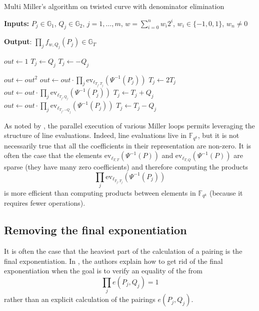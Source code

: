 \documentclass{article}
\newcommand{\gOne}{\mathbb{G}_1}
\newcommand{\gTwo}{\mathbb{G}_2}
\newcommand{\gT}{\mathbb{G}_T}
\newcommand{\ev}{\mathrm{ev}}
\newcommand{\fq}[1]{\mathbb{F}_{q^{#1}}}
\theoremstyle{remark}
\theoremstyle{plain}
\begin{document}
\begin{algorithm}
    \caption{\small Multi Miller's algorithm on twisted curve with denominator elimination}\label{alg:multiMillerAlgorithm}
    \textbf{Inputs:} $P_j \in \gOne$, $Q_j \in \gTwo$, $j=1, \dots, m$, $w = \sum_{i=0}^n w_i 2^i$, $w_i \in \{-1,0,1\}$, $w_n \neq 0$

    \textbf{Output}: $\prod_j f_{w,Q_j}(P_j) \in \gT$
    \begin{algorithmic}
        \State $out \gets 1$
            \State $T_j \gets Q_j$
        \Else
            \State $T_j \gets -Q_j$
        \EndIf

        \State $out \gets out^2$
        \State $out \gets out \cdot \prod_j \ev_{\ell_{T_j,T_j}}(\Psi^{-1}(P_j))$
        \State $T_j \gets 2T_j$
            \State $out \gets out \cdot \prod_j \ev_{\ell_{T_j,Q_j}}(\Psi^{-1}(P_j))$
            \State $T_j \gets T_j+ Q_j$
        \Else
            \State $out \gets out \cdot \prod_j \ev_{\ell_{T_j,-Q_j}}(\Psi^{-1}(P_j))$
            \State $T_j \gets T_j - Q_j$
        \EndIf
        \EndFor
    \end{algorithmic}
\end{algorithm}

As noted by \cite{S-pairing-impl-revisited}, the parallel execution of various Miller loops permits leveraging the structure of line evaluations.
Indeed, line evaluations live in $\fq{k}$, but it is not necessarily true that all the coefficients in their representation are non-zero.
It is often the case that the elements $\ev_{\ell_{T,T}}(\Psi^{-1}(P))$ and $\ev_{\ell_{T,Q}}(\Psi^{-1}(P))$ are sparse (they have many zero coefficients) and therefore computing the products
\[
    \prod_j \ev_{\ell_{T_j,T_j}}(\Psi^{-1}(P_j))
\]
is more efficient than computing products between elements in $\fq{k}$ (because it requires fewer operations).

\subsection{Removing the final exponentiation}

It is often the case that the heaviest part of the calculation of a pairing is the final exponentiation.
In \cite{NE-on-proving-pairings}, the authors explain how to get rid of the final exponentiation when the goal is to verify an equality of the from
\[
    \prod_j e(P_j,Q_j) = 1
\]
rather than an explicit calculation of the pairings $e(P_j,Q_j)$.
\end{document}
